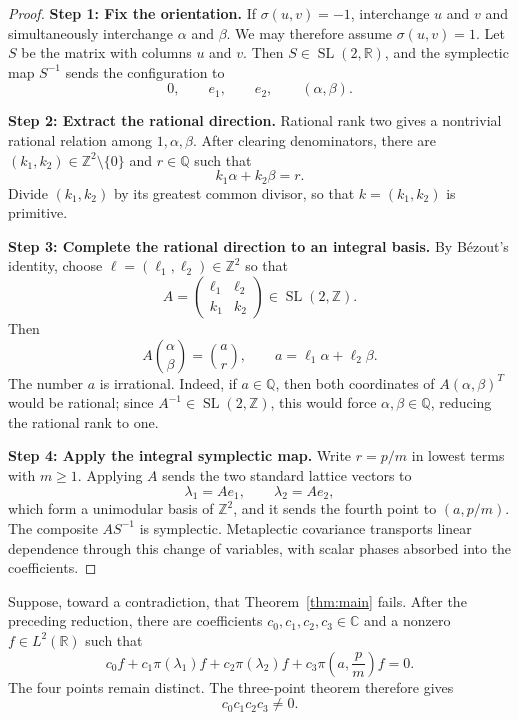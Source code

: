 \documentclass[reqno]{amsart}
\theoremstyle{remark}
\numberwithin{equation}{section}
\newcommand{\R}{\mathbb{R}}
\newcommand{\Q}{\mathbb{Q}}
\newcommand{\Z}{\mathbb{Z}}
\newcommand{\C}{\mathbb{C}}
\newcommand{\SL}{\operatorname{SL}}
\begin{document}
\begin{proof}
\textbf{Step 1: Fix the orientation.}
If \(\sigma(u,v)=-1\), interchange \(u\) and \(v\) and simultaneously
interchange \(\alpha\) and \(\beta\). We may therefore assume
\(\sigma(u,v)=1\). Let \(S\) be the matrix with columns \(u\) and \(v\).
Then \(S\in\SL(2,\R)\), and the symplectic map \(S^{-1}\) sends the
configuration to
\[
  0,\qquad e_1,\qquad e_2,\qquad (\alpha,\beta).
\]

\smallskip
\noindent
\textbf{Step 2: Extract the rational direction.}
Rational rank two gives a nontrivial rational relation among
\(1,\alpha,\beta\). After clearing denominators, there are
\((k_1,k_2)\in\Z^2\setminus\{0\}\) and \(r\in\Q\) such that
\[
  k_1\alpha+k_2\beta=r.
\]
Divide \((k_1,k_2)\) by its greatest common divisor, so that
\(k=(k_1,k_2)\) is primitive.

\smallskip
\noindent
\textbf{Step 3: Complete the rational direction to an integral basis.}
By B\'ezout's identity, choose \(\ell=(\ell_1,\ell_2)\in\Z^2\) so that
\[
  A=
  \begin{pmatrix}
    \ell_1&\ell_2\\
    k_1&k_2
  \end{pmatrix}
  \in\SL(2,\Z).
\]
Then
\[
  A\binom{\alpha}{\beta}
  =\binom{a}{r},
  \qquad
  a=\ell_1\alpha+\ell_2\beta.
\]
The number \(a\) is irrational. Indeed, if \(a\in\Q\), then both
coordinates of \(A(\alpha,\beta)^T\) would be rational; since
\(A^{-1}\in\SL(2,\Z)\), this would force \(\alpha,\beta\in\Q\), reducing the
rational rank to one.

\smallskip
\noindent
\textbf{Step 4: Apply the integral symplectic map.}
Write \(r=p/m\) in lowest terms with \(m\geq1\). Applying \(A\) sends the
two standard lattice vectors to
\[
  \lambda_1=Ae_1,
  \qquad
  \lambda_2=Ae_2,
\]
which form a unimodular basis of \(\Z^2\), and it sends the fourth point to
\((a,p/m)\). The composite \(AS^{-1}\) is symplectic. Metaplectic covariance
transports linear dependence through this change of variables, with scalar
phases absorbed into the coefficients.
\end{proof}

Suppose, toward a contradiction, that Theorem~\ref{thm:main} fails. After the
preceding reduction, there are coefficients \(c_0,c_1,c_2,c_3\in\C\) and a
nonzero \(f\in L^2(\R)\) such that
\begin{equation}
  c_0f+c_1\pi(\lambda_1)f+c_2\pi(\lambda_2)f
  +c_3\pi\left(a,\frac{p}{m}\right)f=0.
  \label{eq:four-term-relation}
\end{equation}
The four points remain distinct. The three-point theorem therefore gives
\begin{equation}
  c_0c_1c_2c_3\neq0.
  \label{eq:coeff-nonzero}
\end{equation}
\end{document}
